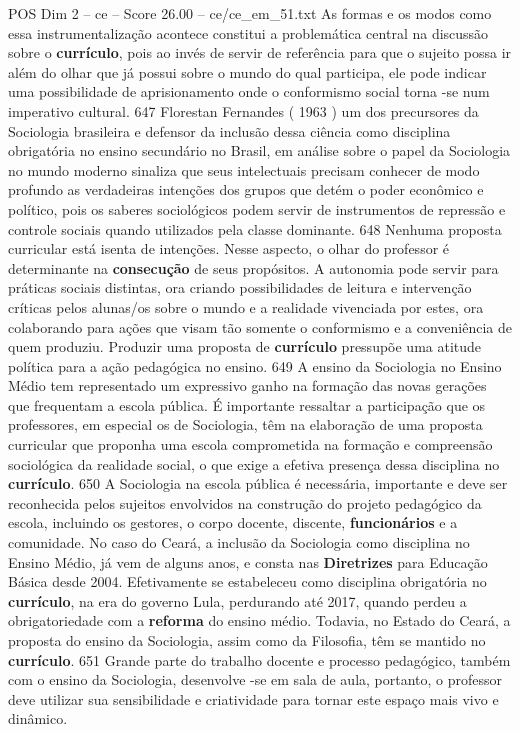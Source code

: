 \begin{textsample}{POS Dim 2 – ce – Score 26.00 – ce/ce\_em\_51.txt}
As formas e os modos como essa instrumentalização acontece constitui a problemática central na discussão sobre o \textbf{currículo}, pois ao invés de servir de referência para que o sujeito possa ir além do olhar que já possui sobre o mundo do qual participa, ele pode indicar uma possibilidade de aprisionamento onde o conformismo social torna -se num imperativo cultural. 647 Florestan Fernandes ( 1963 ) um dos precursores da Sociologia brasileira e defensor da inclusão dessa ciência como disciplina obrigatória no ensino secundário no Brasil, em análise sobre o papel da Sociologia no mundo moderno sinaliza que seus intelectuais precisam conhecer de modo profundo as verdadeiras intenções dos grupos que detém o poder econômico e político, pois os saberes sociológicos podem servir de instrumentos de repressão e controle sociais quando utilizados pela classe dominante. 648 Nenhuma proposta curricular está isenta de intenções.
Nesse aspecto, o olhar do professor é determinante na \textbf{consecução} de seus propósitos.
A autonomia pode servir para práticas sociais distintas, ora criando possibilidades de leitura e intervenção críticas pelos alunas/os sobre o mundo e a realidade vivenciada por estes, ora colaborando para ações que visam tão somente o conformismo e a conveniência de quem produziu.
Produzir uma proposta de \textbf{currículo} pressupõe uma atitude política para a ação pedagógica no ensino. 649 A ensino da Sociologia no Ensino Médio tem representado um expressivo ganho na formação das novas gerações que frequentam a escola pública.
É importante ressaltar a participação que os professores, em especial os de Sociologia, têm na elaboração de uma proposta curricular que proponha uma escola comprometida na formação e compreensão sociológica da realidade social, o que exige a efetiva presença dessa disciplina no \textbf{currículo}. 650 A Sociologia na escola pública é necessária, importante e deve ser reconhecida pelos sujeitos envolvidos na construção do projeto pedagógico da escola, incluindo os gestores, o corpo docente, discente, \textbf{funcionários} e a comunidade.
No caso do Ceará, a inclusão da Sociologia como disciplina no Ensino Médio, já vem de alguns anos, e consta nas \textbf{Diretrizes} para Educação Básica desde 2004.
Efetivamente se estabeleceu como disciplina obrigatória no \textbf{currículo}, na era do governo Lula, perdurando até 2017, quando perdeu a obrigatoriedade com a \textbf{reforma} do ensino médio.
Todavia, no Estado do Ceará, a proposta do ensino da Sociologia, assim como da Filosofia, têm se mantido no \textbf{currículo}. 651 Grande parte do trabalho docente e processo pedagógico, também com o ensino da Sociologia, desenvolve -se em sala de aula, portanto, o professor deve utilizar sua sensibilidade e criatividade para tornar este espaço mais vivo e dinâmico.

\end{textsample}

